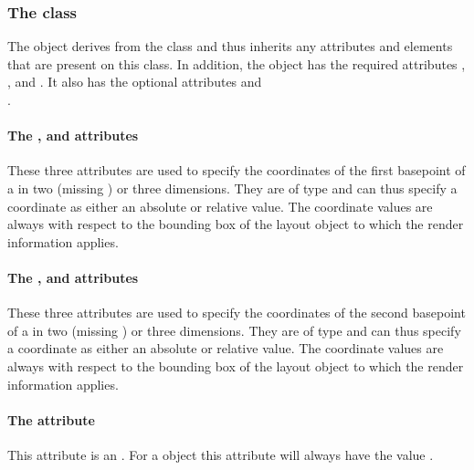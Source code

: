 \subsubsection{The  class}
\label{rendercubicbezier-class}


The \RenderCubicBezier object derives from the \RenderPoint class and
thus inherits any attributes and elements that are present on this
class.
In addition, the \RenderCubicBezier object has the required attributes , ,  and . It also has the optional attributes  and \\ .

\paragraph{The \fixttspace{}, \fixttspace{} and \fixttspace{} attributes}

These three attributes are used to specify the coordinates of the first basepoint of a \RenderCubicBezier in two (missing ) or three dimensions. They are of type \RelAbsVector and can thus specify a coordinate as either an absolute or relative value. The coordinate
values are always with respect to the bounding box of the layout object to which the
render information applies.


\paragraph{The \fixttspace{}, \fixttspace{} and \fixttspace{} attributes}

These three attributes are used to specify the coordinates of the second basepoint of a \RenderCubicBezier in two (missing ) or three dimensions. They are of type \RelAbsVector and can thus specify a coordinate as either an absolute or relative value. The coordinate
values are always with respect to the bounding box of the layout object to which the
render information applies.

\paragraph{The \fixttspace{} attribute}

This attribute is an . For a \RenderCubicBezier object this attribute will always have the value .



